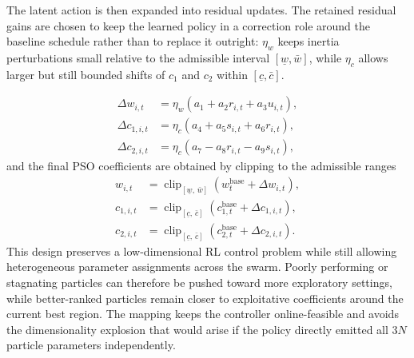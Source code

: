\documentclass[final,5p,times]{elsarticle}
\newcommand{\symPopsize}{N}
\newcommand{\symResWeightW}{\eta_w}
\newcommand{\symResWeightC}{\eta_c}
\newcommand{\symWclipMin}{\underline{w}}
\newcommand{\symWclipMax}{\bar{w}}
\newcommand{\symCclipMin}{\underline{c}}
\newcommand{\symCclipMax}{\bar{c}}
\begin{document}
The latent action is then expanded into residual updates. The retained residual gains are chosen to keep the learned policy in a correction role around the baseline schedule rather than to replace it outright: $\symResWeightW$ keeps inertia perturbations small relative to the admissible interval $[\symWclipMin,\symWclipMax]$, while $\symResWeightC$ allows larger but still bounded shifts of $c_1$ and $c_2$ within $[\symCclipMin,\symCclipMax]$. 

\begin{equation}
\begin{aligned}
\Delta w_{i,t} &= \symResWeightW\left(a_1 + a_2 r_{i,t} + a_3 u_{i,t}\right), \\
\Delta c_{1,i,t} &= \symResWeightC\left(a_4 + a_5 s_{i,t} + a_6 r_{i,t}\right), \\
\Delta c_{2,i,t} &= \symResWeightC\left(a_7 - a_8 r_{i,t} - a_9 s_{i,t}\right),
\end{aligned}
\label{eq:rank_residual_delta}
\end{equation}
and the final PSO coefficients are obtained by clipping to the admissible ranges
\begin{equation}
\begin{aligned}
w_{i,t} &= \operatorname{clip}_{[\symWclipMin,\,\symWclipMax]}\!\left(w_t^{\mathrm{base}} + \Delta w_{i,t}\right), \\
c_{1,i,t} &= \operatorname{clip}_{[\symCclipMin,\,\symCclipMax]}\!\left(c_{1,t}^{\mathrm{base}} + \Delta c_{1,i,t}\right), \\
c_{2,i,t} &= \operatorname{clip}_{[\symCclipMin,\,\symCclipMax]}\!\left(c_{2,t}^{\mathrm{base}} + \Delta c_{2,i,t}\right).
\end{aligned}
\label{eq:rank_residual_final}
\end{equation}
This design preserves a low-dimensional RL control problem while still allowing heterogeneous parameter assignments across the swarm.
Poorly performing or stagnating particles can therefore be pushed toward more exploratory settings, while better-ranked particles remain closer to exploitative coefficients around the current best region.
The mapping keeps the controller online-feasible and avoids the dimensionality explosion that would arise if the policy directly emitted all $3\symPopsize$ particle parameters independently.
\end{document}
